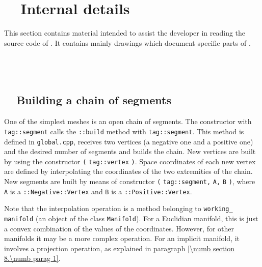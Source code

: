 

\chapter{~~Internal details}\label{\numb section 12}

This section contains material intended to assist the developer in reading the source code
of \maniFEM.
It contains mainly drawings which document specific parts of \maniFEM.


\section{~~\cinza{[empty]}}\label{\numb section 12.\numb parag 1}


\section{~~Building a chain of segments}\label{\numb section 12.\numb parag 2}

One of the simplest meshes is an open chain of segments.
The {\small\tt {}} constructor with {\small\tt \textcolor{tag}{tag}::segment}
calls the {\small\tt{}::build} method with {\small\tt \textcolor{tag}{tag}::segment}.
This method is defined in
{\small\tt global.cpp}, receives two vertices (a negative one and a positive one)
and the desired number of segments and builds the chain.
New vertices are built by using the constructor\hfil\break
{\small\tt {}} {\small\tt(} {\small\tt\textcolor{tag}{tag}::vertex} {\small\tt)}.
Space coordinates of each new vertex are defined by interpolating the coordinates of the
two extremities of the chain.
New segments are built by means of constructor {\small\tt {}} {\small\tt(}
{\small\tt\textcolor{tag}{tag}::segment,} {\small\tt A,} {\small\tt B} {\small\tt )},
where {\small\tt A} is a {\small\tt {}::Negative::Vertex} and {\small\tt B} is a
{\small\tt {}::Positive::Vertex}.

Note that the interpolation operation is a method belonging to {\small\tt working\_\,manifold}
(an object of the class {\small\tt Manifold}).
For a Euclidian manifold, this is just a convex combination of the values of the coordinates.
However, for other manifolds it may be a more complex operation.
For an implicit manifold, it involves a projection operation, as explained in paragraph
\ref{\numb section 8.\numb parag 1}.


